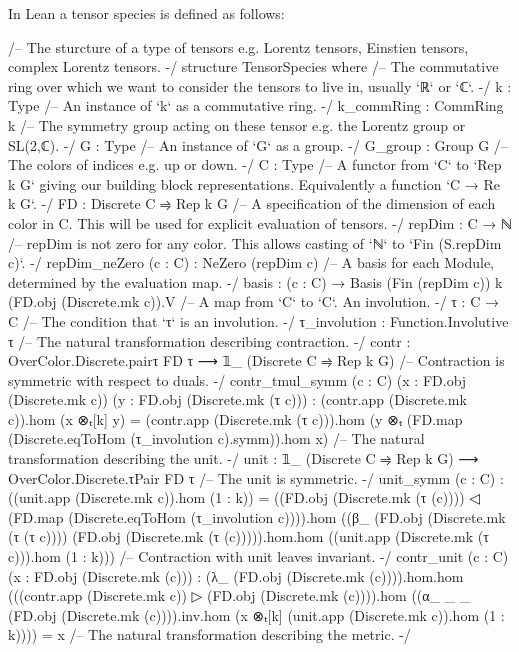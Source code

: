 \documentclass[a4paper, 11pt]{article}
\begin{document}
In Lean a tensor species is defined as follows:
\begin{codeLong}
/-- The sturcture of a type of tensors e.g. Lorentz tensors, Einstien tensors,
complex Lorentz tensors. -/
structure TensorSpecies where
  /-- The commutative ring  over which we want to consider the tensors to live in,
    usually `ℝ` or `ℂ`. -/
  k : Type
  /-- An instance of `k` as a commutative ring. -/
  k_commRing : CommRing k
  /-- The symmetry group acting on these tensor e.g. the Lorentz group or SL(2,ℂ). -/
  G : Type
  /-- An instance of `G` as a group. -/
  G_group : Group G
  /-- The colors of indices e.g. up or down. -/
  C : Type
  /-- A functor from `C` to `Rep k G` giving our building block representations.
    Equivalently a function `C → Re k G`. -/
  FD : Discrete C ⥤ Rep k G
  /-- A specification of the dimension of each color in C. This will be used for explicit
    evaluation of tensors. -/
  repDim : C → ℕ
  /-- repDim is not zero for any color. This allows casting of `ℕ` to `Fin (S.repDim c)`. -/
  repDim_neZero (c : C) : NeZero (repDim c)
  /-- A basis for each Module, determined by the evaluation map. -/
  basis : (c : C) → Basis (Fin (repDim c)) k (FD.obj (Discrete.mk c)).V
  /-- A map from `C` to `C`. An involution. -/
  τ : C → C
  /-- The condition that `τ` is an involution. -/
  τ_involution : Function.Involutive τ
  /-- The natural transformation describing contraction. -/
  contr : OverColor.Discrete.pairτ FD τ ⟶ 𝟙_ (Discrete C ⥤ Rep k G)
  /-- Contraction is symmetric with respect to duals. -/
  contr_tmul_symm (c : C) (x : FD.obj (Discrete.mk c))
      (y : FD.obj (Discrete.mk (τ c))) :
    (contr.app (Discrete.mk c)).hom (x ⊗ₜ[k] y) = (contr.app (Discrete.mk (τ c))).hom
    (y ⊗ₜ (FD.map (Discrete.eqToHom (τ_involution c).symm)).hom x)
  /-- The natural transformation describing the unit. -/
  unit : 𝟙_ (Discrete C ⥤ Rep k G) ⟶ OverColor.Discrete.τPair FD τ
  /-- The unit is symmetric. -/
  unit_symm (c : C) :
    ((unit.app (Discrete.mk c)).hom (1 : k)) =
    ((FD.obj (Discrete.mk (τ (c)))) ◁
      (FD.map (Discrete.eqToHom (τ_involution c)))).hom
    ((β_ (FD.obj (Discrete.mk (τ (τ c)))) (FD.obj (Discrete.mk (τ (c))))).hom.hom
    ((unit.app (Discrete.mk (τ c))).hom (1 : k)))
  /-- Contraction with unit leaves invariant. -/
  contr_unit (c : C) (x : FD.obj (Discrete.mk (c))) :
    (λ_ (FD.obj (Discrete.mk (c)))).hom.hom
    (((contr.app (Discrete.mk c)) ▷ (FD.obj (Discrete.mk (c)))).hom
    ((α_ _ _ (FD.obj (Discrete.mk (c)))).inv.hom
    (x ⊗ₜ[k] (unit.app (Discrete.mk c)).hom (1 : k)))) = x
  /-- The natural transformation describing the metric. -/

\end{codeLong}
\end{document}
